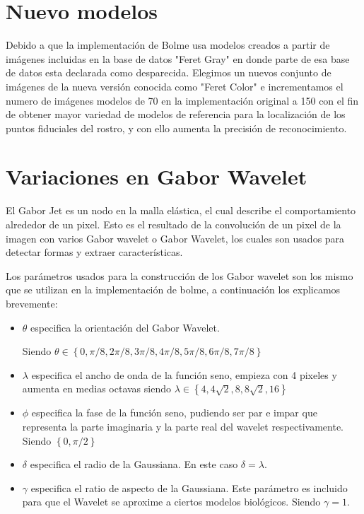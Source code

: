 \section{Nuevo modelos}
Debido a que la implementación de Bolme \cite{bolme2003elastic} usa modelos creados a partir de imágenes incluidas en la base de datos "Feret Gray" en donde parte de esa base de datos esta declarada como desparecida. Elegimos un nuevos conjunto de imágenes de la nueva versión conocida como "Feret Color" e incrementamos el numero de imágenes modelos de 70 en la implementación original a 150 con el fin de obtener mayor variedad de modelos de referencia para la localización de los puntos fiduciales del rostro, y con ello aumenta la precisión de reconocimiento.



\section{Variaciones en Gabor Wavelet}
El Gabor Jet es un nodo en la malla elástica, el cual describe el comportamiento alrededor de un pixel. Esto es el resultado de la convolución de un pixel de la imagen con varios Gabor wavelet o Gabor Wavelet, los cuales son usados para detectar formas y extraer características.


Los parámetros usados para la construcción de los Gabor wavelet son los mismo que se utilizan en la implementación de bolme\cite{bolme2003elastic}, a continuación los explicamos brevemente:
\begin{itemize}
\item $\theta$ especifica la orientación del Gabor Wavelet.\par Siendo $\theta \in \left\{0,\pi/8,2\pi/8,3\pi/8,4\pi/8,5\pi/8,6\pi/8,7\pi/8 \right\}$
\item $\lambda$ especifica el ancho de onda de la función seno, empieza con 4 pixeles y aumenta en medias octavas siendo $\lambda \in \left\{4,4\sqrt{2},8,8\sqrt{2},16\right\} $
\item $\phi$ especifica la fase de la función seno, pudiendo ser par e impar que representa la parte imaginaria y la parte real del wavelet respectivamente. Siendo $\left\{0,\pi/2\right\}$
\item $\delta$ especifica el radio de la Gaussiana. En este caso $\delta=\lambda$.
\item $\gamma$ especifica el ratio de aspecto de la Gaussiana. Este parámetro es incluido para que el Wavelet se aproxime a ciertos modelos biológicos. Siendo $\gamma=1$.
\end{itemize}

